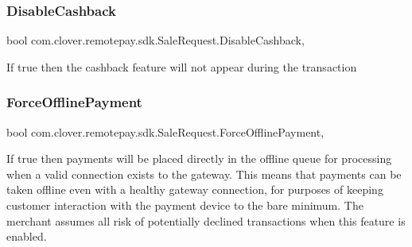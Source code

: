 \mbox{\label{classcom_1_1clover_1_1remotepay_1_1sdk_1_1_sale_request_a02447b96d94225a88f3659fa3a5f1ea4}} 
\subsubsection{\texorpdfstring{Disable\+Cashback}{DisableCashback}}
{\footnotesize\ttfamily bool com.\+clover.\+remotepay.\+sdk.\+Sale\+Request.\+Disable\+Cashback\hspace{0.3cm}{\ttfamily [get]}, {\ttfamily [set]}}



If true then the cashback feature will not appear during the transaction 

\mbox{\label{classcom_1_1clover_1_1remotepay_1_1sdk_1_1_sale_request_a3b9ec1f158eda7a094c83a34a6c2e02a}} 
\subsubsection{\texorpdfstring{Force\+Offline\+Payment}{ForceOfflinePayment}}
{\footnotesize\ttfamily bool com.\+clover.\+remotepay.\+sdk.\+Sale\+Request.\+Force\+Offline\+Payment\hspace{0.3cm}{\ttfamily [get]}, {\ttfamily [set]}}



If true then payments will be placed directly in the offline queue for processing when a valid connection exists to the gateway. This means that payments can be taken offline even with a healthy gateway connection, for purposes of keeping customer interaction with the payment device to the bare minimum. The merchant assumes all risk of potentially declined transactions when this feature is enabled. 

